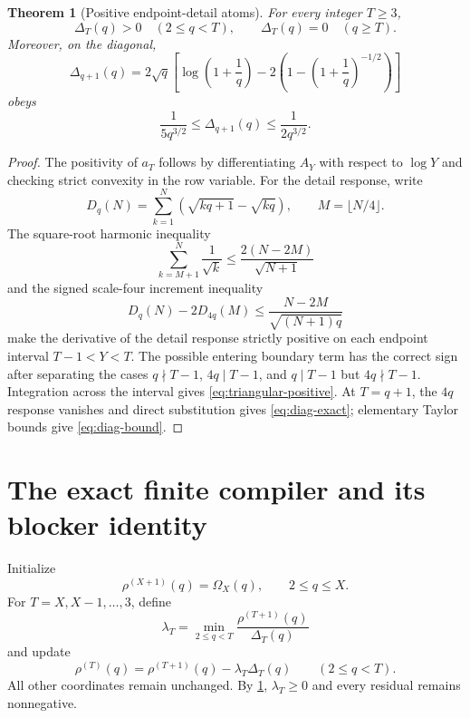 \documentclass[11pt]{article}
\newtheorem{theorem}{Theorem}[section]
\newcommand{\Om}{\Omega}
\begin{document}
\begin{theorem}[Positive endpoint-detail atoms]\label{thm:positive-atoms}
For every integer $T\ge3$,
\begin{equation}
 \Delta_T(q)>0\quad(2\le q<T),
 \qquad
 \Delta_T(q)=0\quad(q\ge T).
 \label{eq:triangular-positive}
\end{equation}
Moreover, on the diagonal,
\begin{equation}
 \Delta_{q+1}(q)=2\sqrt q\left[\log\left(1+\frac1q\right)
 -2\left(1-\left(1+\frac1q\right)^{-1/2}\right)\right]
 \label{eq:diag-exact}
\end{equation}
obeys
\begin{equation}
 \frac1{5q^{3/2}}\le\Delta_{q+1}(q)\le\frac1{2q^{3/2}}.
 \label{eq:diag-bound}
\end{equation}
\end{theorem}

\begin{proof}
The positivity of $a_T$ follows by differentiating $A_Y$ with respect to $\log Y$ and checking strict convexity in the row variable. For the detail response, write
\[
 D_q(N)=\sum_{k=1}^N(\sqrt{kq+1}-\sqrt{kq}),\qquad M=\lfloor N/4\rfloor.
\]
The square-root harmonic inequality
\[
 \sum_{k=M+1}^N\frac1{\sqrt k}
 \le\frac{2(N-2M)}{\sqrt{N+1}}
\]
and the signed scale-four increment inequality
\[
 D_q(N)-2D_{4q}(M)\le\frac{N-2M}{\sqrt{(N+1)q}}
\]
make the derivative of the detail response strictly positive on each endpoint interval $T-1<Y<T$. The possible entering boundary term has the correct sign after separating the cases $q\nmid T-1$, $4q\mid T-1$, and $q\mid T-1$ but $4q\nmid T-1$. Integration across the interval gives \eqref{eq:triangular-positive}. At $T=q+1$, the $4q$ response vanishes and direct substitution gives \eqref{eq:diag-exact}; elementary Taylor bounds give \eqref{eq:diag-bound}.
\end{proof}

\section{The exact finite compiler and its blocker identity}

Initialize
\begin{equation}
 \rho^{(X+1)}(q)=\Om_X(q),\qquad 2\le q\le X.
 \label{eq:initial-residual}
\end{equation}
For $T=X,X-1,\ldots,3$, define
\begin{equation}
 \lambda_T=\min_{2\le q<T}\frac{\rho^{(T+1)}(q)}{\Delta_T(q)}
 \label{eq:greedy-lambda}
\end{equation}
and update
\begin{equation}
 \rho^{(T)}(q)=\rho^{(T+1)}(q)-\lambda_T\Delta_T(q)
 \qquad(2\le q<T).
 \label{eq:greedy-update}
\end{equation}
All other coordinates remain unchanged. By \cref{thm:positive-atoms}, $\lambda_T\ge0$ and every residual remains nonnegative.
\end{document}

